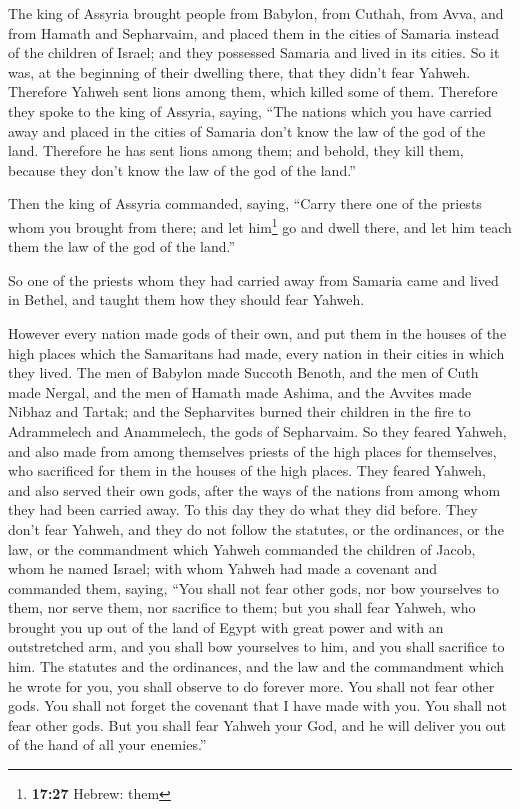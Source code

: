  The king of Assyria brought people from Babylon, from
Cuthah, from Avva, and from Hamath and Sepharvaim, and placed them in
the cities of Samaria instead of the children of Israel; and they
possessed Samaria and lived in its cities.  So it was, at
the beginning of their dwelling there, that they didn't fear Yahweh.
Therefore Yahweh sent lions among them, which killed some of them.
 Therefore they spoke to the king of Assyria, saying,
``The nations which you have carried away and placed in the cities of
Samaria don't know the law of the god of the land. Therefore he has sent
lions among them; and behold, they kill them, because they don't know
the law of the god of the land.''

 Then the king of Assyria commanded, saying, ``Carry
there one of the priests whom you brought from there; and let
him\footnote{\textbf{17:27} Hebrew: them} go and dwell there, and let
him teach them the law of the god of the land.''

 So one of the priests whom they had carried away from
Samaria came and lived in Bethel, and taught them how they should fear
Yahweh.

 However every nation made gods of their own, and put
them in the houses of the high places which the Samaritans had made,
every nation in their cities in which they lived.  The
men of Babylon made Succoth Benoth, and the men of Cuth made Nergal, and
the men of Hamath made Ashima,  and the Avvites made
Nibhaz and Tartak; and the Sepharvites burned their children in the fire
to Adrammelech and Anammelech, the gods of Sepharvaim. 
So they feared Yahweh, and also made from among themselves priests of
the high places for themselves, who sacrificed for them in the houses of
the high places.  They feared Yahweh, and also served
their own gods, after the ways of the nations from among whom they had
been carried away.  To this day they do what they did
before. They don't fear Yahweh, and they do not follow the statutes, or
the ordinances, or the law, or the commandment which Yahweh commanded
the children of Jacob, whom he named Israel;  with whom
Yahweh had made a covenant and commanded them, saying, ``You shall not
fear other gods, nor bow yourselves to them, nor serve them, nor
sacrifice to them;  but you shall fear Yahweh, who
brought you up out of the land of Egypt with great power and with an
outstretched arm, and you shall bow yourselves to him, and you shall
sacrifice to him.  The statutes and the ordinances, and
the law and the commandment which he wrote for you, you shall observe to
do forever more. You shall not fear other gods.  You
shall not forget the covenant that I have made with you. You shall not
fear other gods.  But you shall fear Yahweh your God, and
he will deliver you out of the hand of all your enemies.''

